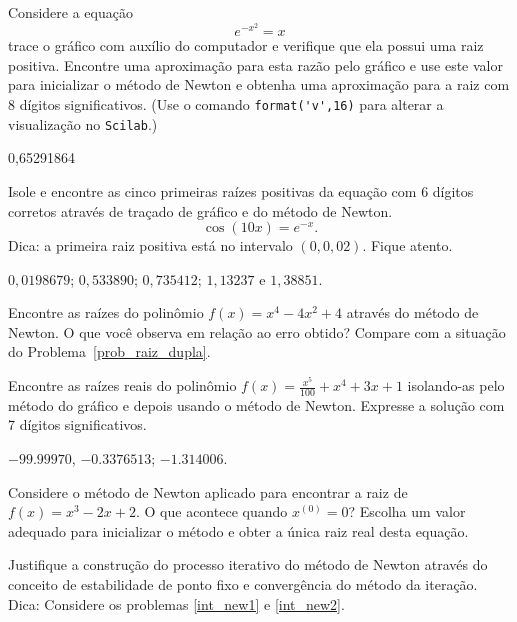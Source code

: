 \begin{exer}\label{new1} Considere a equação
  $$e^{-x^2}=x$$
trace o gráfico com auxílio do computador e verifique que ela possui uma raiz positiva. Encontre uma aproximação para esta razão pelo gráfico e use este valor para inicializar o método de Newton e obtenha uma aproximação para a raiz com 8 dígitos significativos. \ifisscilab (Use o comando \verb+format('v',16)+ para alterar a visualização no \verb+Scilab+.)\fi
\end{exer}
\begin{resp}
  0,65291864    
  \end{resp}

\begin{exer}\label{new2} Isole e encontre as cinco primeiras raízes positivas da equação com 6 dígitos corretos através de traçado de gráfico e do método de Newton.
$$\cos(10x)=e^{-x}.$$ Dica: a primeira raiz positiva está no intervalo $(0, 0,02)$. Fique atento.
\end{exer}
\begin{resp}
   $0,0198679$; $0,533890$; $0,735412$; $1,13237$ e $1,38851$.
  \end{resp}


\begin{exer}\label{new3} Encontre as raízes do polinômio $f(x)=x^4-4x^2+4$ através do método de Newton. O que você observa em relação ao erro obtido? Compare com a situação do Problema~\ref{prob_raiz_dupla}.
\end{exer}

\begin{exer}\label{new4} Encontre as raízes reais do polinômio $f(x)=\frac{x^5}{100}+x^4+3x+1$ isolando-as pelo método do gráfico e depois usando o método de Newton. Expresse a solução com 7 dígitos significativos.
\end{exer}
\begin{resp}
 $-99.99970$, $-0.3376513$; $-1.314006$.
 \end{resp}

\begin{exer}Considere o método de Newton aplicado para encontrar a raiz de $f(x)=x^3-2x+2$. O que acontece quando $x^{(0)}=0$? Escolha um valor adequado para inicializar o método e obter a única raiz real desta equação.
\end{exer}

\begin{exer} Justifique a construção do processo iterativo do método de Newton através do conceito de estabilidade de ponto fixo e convergência do método da iteração. Dica: Considere os problemas \ref{int_new1} e \ref{int_new2}.
\end{exer}

